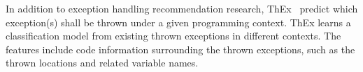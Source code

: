In addition to exception handling recommendation research,
ThEx~\cite{thex-ase22} predict which exception(s) shall be thrown
under a given programming context. ThEx learns a classification model
from existing thrown exceptions in different contexts. The features
include code information surrounding the thrown exceptions, such as
the thrown locations and related variable names.

